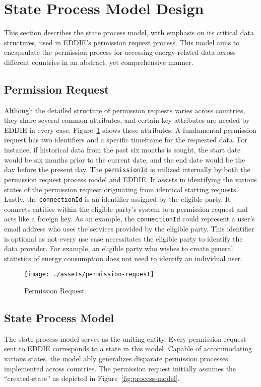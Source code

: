 \section{State Process Model Design}\label{sec:state-process-model-design}
This section describes the state process model, with emphasis on its critical data structures, used in EDDIE's permission request process.
This model aims to encapsulate the permission process for accessing energy-related data across different countries in an abstract, yet comprehensive manner.

\subsection{Permission Request}\label{subsec:permission-request}
Although the detailed structure of permission requests varies across countries, they share several common attributes,
and certain key attributes are needed by EDDIE in every case.
Figure\ \ref{fig:permission-request} shows these attributes.
A fundamental permission request has two identifiers and a specific timeframe for the requested data.
For instance, if historical data from the past six months is sought, the start date would be six months prior to the current date,
and the end date would be the day before the present day.
The \texttt{permissionId} is utilized internally by both the permission request process model and EDDIE.
It assists in identifying the various states of the permission request originating from identical starting requests.
Lastly, the \texttt{connectionId} is an identifier assigned by the eligible party.
It connects entities within the eligible party's system to a permission request and acts like a foreign key.
As an example, the \texttt{connectionId} could represent a user's email address who uses the services provided by the eligible party.
This identifier is optional as not every use case necessitates the eligible party to identify the data provider.
For example, an eligible party who wishes to create general statistics of energy consumption does not need
to identify an individual user.

\begin{figure}[h]
    \texttt{[image: ./assets/permission-request]}
    \caption{Permission Request}
    \label{fig:permission-request}
\end{figure}

\subsection{State Process Model}\label{subsec:state-process-model}
The state process model serves as the uniting entity.
Every permission request sent to EDDIE corresponds to a state in this model.
Capable of accommodating various states, the model ably generalizes disparate permission processes implemented across countries.
The permission request initially assumes the ``created-state'' as depicted in Figure\ \ref{fig:process-model}.


